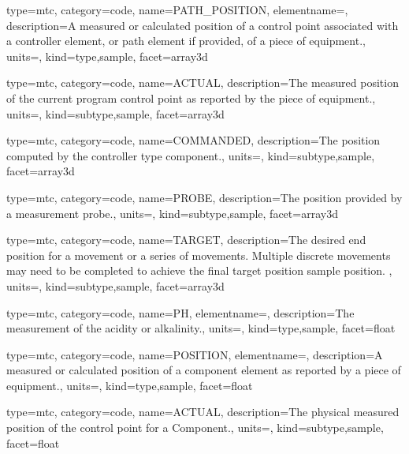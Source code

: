 {
  type=mtc,
  category=code,
  name={PATH\_POSITION},
  elementname=,
  description={A measured or calculated position of a control point associated with a \gls{controller} element, or \gls{path} element if provided, of a piece of equipment.},
  units=,
  kind={type,sample},
  facet={\gls{array3d}}
}


{
  type=mtc,
  category=code,
  name={ACTUAL},
  description={The measured position of the current program control point as reported by the piece of equipment.},
  units=,
  kind={subtype,sample},
  facet={\gls{array3d}}
}


{
  type=mtc,
  category=code,
  name={COMMANDED},
  description={The position computed by the \gls{controller} type component.},
  units=,
  kind={subtype,sample},
  facet={\gls{array3d}}
}


{
  type=mtc,
  category=code,
  name={PROBE},
  description={The position provided by a measurement probe.},
  units=,
  kind={subtype,sample},
  facet={\gls{array3d}}
}


{
  type=mtc,
  category=code,
  name={TARGET},
  description={The desired end position for a movement or a series of movements. Multiple discrete movements may need to be completed to achieve the final \gls{target position sample} position.  },
  units=,
  kind={subtype,sample},
  facet={\gls{array3d}}
}


{
  type=mtc,
  category=code,
  name={PH},
  elementname=,
  description={The measurement of the acidity or alkalinity.},
  units=,
  kind={type,sample},
  facet={\gls{float}}
}


{
  type=mtc,
  category=code,
  name={POSITION},
  elementname=,
  description={A measured or calculated position of a \gls{component} element as reported by a piece of equipment.},
  units=,
  kind={type,sample},
  facet={\gls{float}}
}


{
  type=mtc,
  category=code,
  name={ACTUAL},
  description={The physical measured position of the control point for a Component.},
  units=,
  kind={subtype,sample},
  facet={\gls{float}}
}


